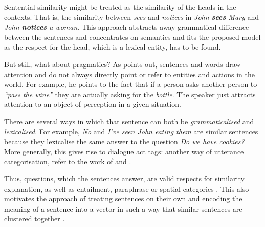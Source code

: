 \documentclass[11pt]{article}
\begin{document}
Sentential similarity might be treated as the similarity of the heads in the contexts. That is, the similarity between \textit{sees} and \textit{notices} in \textit{John \textbf{sees} Mary} and \textit{John \textbf{notices} a woman}. This approach abstracts away grammatical difference between the sentences and concentrates on semantics and fits the proposed model as the respect for the head, which is a lexical entity, has to be found.


But still, what about pragmatics? As  points out, sentences and words draw attention and do not always directly point or refer to entities and actions in the world. For example, he points to the fact that if a person asks another person to \textit{``pass the wine''} they are actually asking for the \textit{bottle}. The speaker just attracts attention to an object of perception in a given situation.

There are several ways in which that sentence can both be \emph{grammaticalised} and \emph{lexicalised}. For example, \textit{No} and \textit{I've seen John eating them} are similar sentences because they lexicalise the same answer to the question \textit{Do we have cookies?} More generally, this gives rise to dialogue act tags: another way of utterance categorisation, refer to the work of  and .

Thus, questions, which the sentences answer, are valid respects for similarity explanation, as well as entailment, paraphrase \cite{White:2015:WSE:2838931.2838932} or spatial categories \cite{ritter-EtAl:2015:*SEM2015}. This also motivates the approach of treating sentences on their own and encoding the meaning of a sentence into a vector in such a way that similar sentences are clustered together \cite{DBLP:journals/corr/abs-1003-4394,baroni2014frege,Socher:2012:SCT:2390948.2391084,wieting2015paraphrase,DBLP:journals/corr/HillCK16}.
\end{document}
